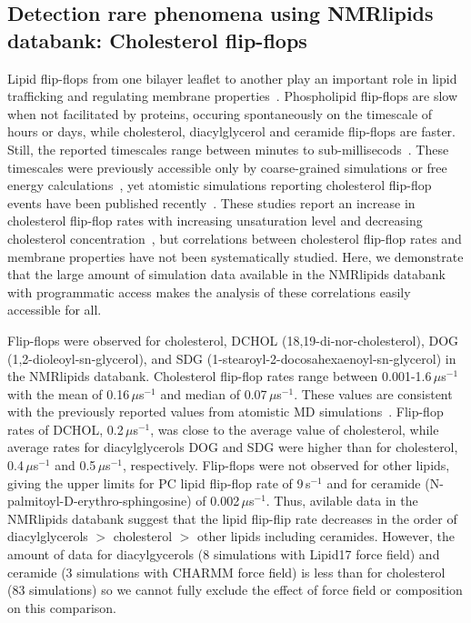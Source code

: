 \documentclass[fleqn,10pt]{wlscirep}
\begin{document}
\subsection{Detection rare phenomena using NMRlipids databank: Cholesterol flip-flops}
Lipid flip-flops from one bilayer leaflet to another play an important role in lipid trafficking and regulating membrane properties~\cite{vanmeer08}. Phospholipid flip-flops are slow when not facilitated by proteins, occuring spontaneously on the timescale of hours or days, while cholesterol, diacylglycerol and ceramide flip-flops are faster. Still, the reported timescales range between minutes to sub-millisecods~\cite{vanmeer08,steck12,parisio16,gu19}. These timescales were previously accessible only by coarse-grained simulations or free energy calculations~\cite{parisio16}, yet atomistic simulations reporting cholesterol flip-flop events have been published recently~\cite{gu19,javanainen19,baral20}. 
These studies report an increase in cholesterol flip-flop rates with increasing unsaturation level and decreasing cholesterol concentration~\cite{gu19,javanainen19}, but correlations between cholesterol flip-flop rates and membrane properties have not been systematically studied. Here, we demonstrate that the large amount of simulation data available in the NMRlipids databank with programmatic access makes the analysis of these correlations easily accessible for all.


Flip-flops were observed for cholesterol, %
DCHOL (18,19-di-nor-cholesterol), %
DOG (1,2-dioleoyl-sn-glycerol), %
and SDG (1-stearoyl-2-docosahexaenoyl-sn-glycerol) in the NMRlipids databank. Cholesterol flip-flop rates range between 0.001-1.6\,$\mu$s$^{-1}$ with the mean of 0.16\,$\mu$s$^{-1}$ and median of 0.07\,$\mu$s$^{-1}$. These values are consistent with the previously reported values from atomistic MD simulations~\cite{gu19,javanainen19,baral20}. Flip-flop rates of DCHOL, 0.2\,$\mu$s$^{-1}$, was close to the average value of cholesterol, while average rates for diacylglycerols DOG and SDG were higher than for cholesterol, 0.4\,$\mu$s$^{-1}$ and 0.5\,$\mu$s$^{-1}$, respectively. Flip-flops were not observed for other lipids, giving the upper limits for PC lipid flip-flop rate of 9\,s$^{-1}$ and for ceramide (N-palmitoyl-D-erythro-sphingosine) of 0.002\,$\mu$s$^{-1}$. Thus, avilable data in the NMRlipids databank suggest that the lipid flip-flip rate decreases in the order of diacylglycerols $>$ cholesterol $>$ other lipids including ceramides. However, the amount of data for diacylgycerols (8 simulations with Lipid17 force field) and ceramide (3 simulations with CHARMM force field) is less than for cholesterol (83 simulations) so we cannot fully exclude the effect of force field or composition on this comparison.
\end{document}
